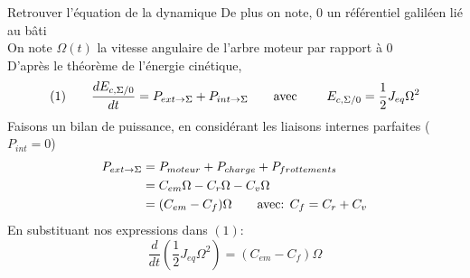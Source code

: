 \documentclass{article} %
\begin{document}
{\begin{démonstration}{Retrouver l'équation de la dynamique}
De plus on note, $0$ un référentiel galiléen lié au bâti\\
On note $\Omega(t)$ la vitesse angulaire de l'arbre moteur par rapport à $0$\vspace*{7pt}\\
D'après le théorème de l'énergie cinétique,\\
$$ (1)\qquad \dfrac{dE_{c,\Sigma/0}}{dt}=P_{ext\to\Sigma}+P_{int\to\Sigma}\text{\qquad avec \qquad} E_{c,\Sigma/0}=\dfrac{1}{2}J_{eq}\Omega^2 $$
Faisons un bilan de puissance, en considérant les liaisons internes parfaites ($P_{int}=0$)
\begin{align*}
P_{ext \to \Sigma} &= P_{moteur} + P_{charge} + P_{frottements}\\
&= C_{em}\Omega - C_r\Omega - C_{v}\Omega\\
&= (C_{em} - C_f)\Omega \text{\qquad avec: } C_f=C_r+C_v
\end{align*}
En substituant nos expressions dans $(1)$:
$$ \frac{d}{dt}\left(\frac{1}{2} J_{eq} \Omega^2\right) = (C_{em} - C_f)\Omega $$


\end{démonstration}}
\end{document}
